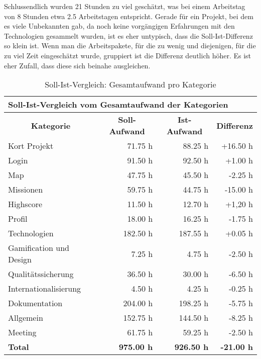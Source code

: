 Schlussendlich wurden 21 Stunden zu viel geschätzt, was bei einem Arbeitstag von 8 Stunden etwa 2.5 Arbeitstagen entspricht.
Gerade für ein Projekt, bei dem es viele Unbekannten gab, da noch keine vorgängigen Erfahrungen mit den Technologien gesammelt wurden, ist es eher untypisch, dass die Soll-Ist-Differenz so klein ist.
Wenn man die Arbeitspakete, für die zu wenig und diejenigen, für die zu viel Zeit eingeschätzt wurde, gruppiert ist die Differenz deutlich höher.
Es ist eher Zufall, dass diese sich beinahe ausgleichen.


\begin{table}[H]
\centering
\begin{tabular}{|l|r|r|r|}
\hline
\multicolumn{4}{|l|}{\textbf{Soll-Ist-Vergleich vom Gesamtaufwand der Kategorien}} \\
\hline
\multicolumn{1}{|c|}{\textbf{Kategorie}} & \multicolumn{1}{|c|}{\textbf{Soll-Aufwand}} & \multicolumn{1}{|c|}{\textbf{Ist-Aufwand}} & \multicolumn{1}{|c|}{\textbf{Differenz}}\\
\hline
Kort Projekt & 71.75 h & 88.25 h & +16.50 h \\
\hline
Login & 91.50 h & 92.50 h & +1.00 h \\
\hline
Map & 47.75	h & 45.50 h & -2.25 h \\
\hline
Missionen & 59.75 h & 44.75 h & -15.00 h \\
\hline
Highscore & 11.50 h & 12.70 h & +1,20 h \\
\hline
Profil & 18.00 h & 16.25 h & -1.75 h \\
\hline
Technologien & 182.50 h & 187.55 h & +0.05 h \\
\hline
Gamification und Design & 7.25 h & 4.75 h & -2.50 h \\
\hline
Qualitätssicherung & 36.50 h & 30.00 h & -6.50 h \\
\hline
Internationalisierung & 4.50 h & 4.25 h & -0.25 h \\
\hline
Dokumentation & 204.00 h & 198.25 h & -5.75 h \\
\hline
Allgemein & 152.75 h & 144.50 h & -8.25 h \\
\hline
Meeting & 61.75 h & 59.25 h & -2.50 h \\
\hline
\textbf{Total} & \textbf{975.00 h} & \textbf{926.50 h} & \textbf{-21.00 h} \\
\hline
\end{tabular}
\caption{Soll-Ist-Vergleich: Gesamtaufwand pro Kategorie}\label{pm-arbeitsaufwand-kategorie-ges}
\end{table}

